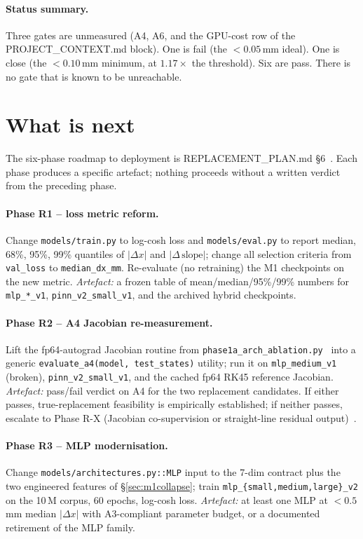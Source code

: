 \documentclass[11pt,a4paper]{article}
\begin{document}
\paragraph{Status summary.} Three gates are unmeasured (A4, A6, and
the GPU-cost row of the PROJECT\_CONTEXT.md block). One is fail
(the $<0.05$\,mm ideal). One is close (the $<0.10$\,mm minimum, at
$1.17\times$ the threshold). Six are pass. There is no gate that is
known to be unreachable.

\section{What is next}\label{sec:next}

The six-phase roadmap to deployment is REPLACEMENT\_PLAN.md
\S 6~\cite{replacementplan}. Each phase produces a specific
artefact; nothing proceeds without a written verdict from the
preceding phase.

\paragraph{Phase R1 -- loss metric reform.} Change
\texttt{models/train.py} to log-cosh loss and \texttt{models/eval.py}
to report median, 68\%, 95\%, 99\% quantiles of $|\Delta x|$ and
$|\Delta\,\text{slope}|$; change all selection criteria from
\texttt{val\_loss} to \texttt{median\_dx\_mm}. Re-evaluate (no
retraining) the M1 checkpoints on the new metric.
\emph{Artefact:} a frozen table of mean/median/95\%/99\% numbers
for \texttt{mlp\_*\_v1}, \texttt{pinn\_v2\_small\_v1}, and the
archived hybrid checkpoints.

\paragraph{Phase R2 -- A4 Jacobian re-measurement.} Lift the
fp64-autograd Jacobian routine from
\texttt{phase1a\_arch\_ablation.py}~\cite{adr0007} into a generic
\texttt{evaluate\_a4(model, test\_states)} utility; run it on
\texttt{mlp\_medium\_v1} (broken), \texttt{pinn\_v2\_small\_v1}, and
the cached fp64 RK45 reference Jacobian.
\emph{Artefact:} pass/fail verdict on A4 for the two replacement
candidates. If either passes, true-replacement feasibility is
empirically established; if neither passes, escalate to Phase R-X
(Jacobian co-supervision or straight-line residual
output)~\cite{replacementplan}.

\paragraph{Phase R3 -- MLP modernisation.} Change
\texttt{models/architectures.py::MLP} input to the 7-dim contract
plus the two engineered features of \S\ref{sec:m1collapse}; train
\texttt{mlp\_\{small,medium,large\}\_v2} on the 10\,M corpus, 60
epochs, log-cosh loss. \emph{Artefact:} at least one MLP at
$<0.5$\,mm median $|\Delta x|$ with A3-compliant parameter budget,
or a documented retirement of the MLP family.
\end{document}

